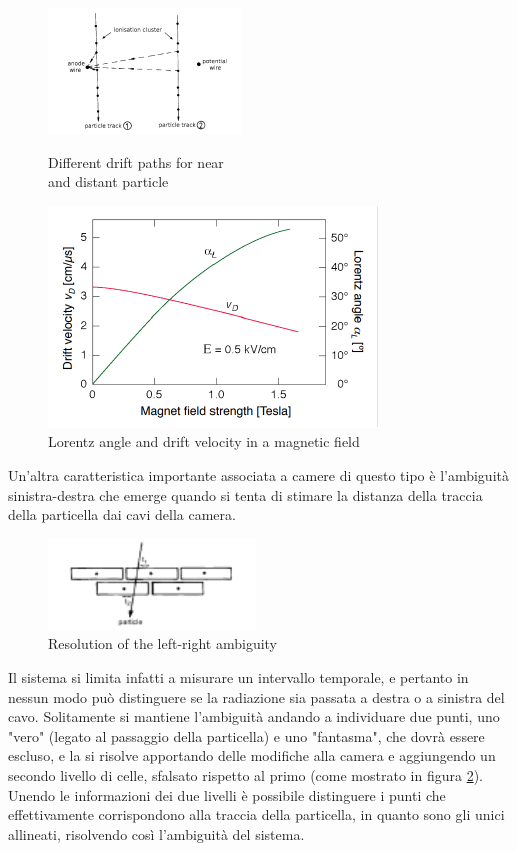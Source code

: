 \documentclass[a4paper,11pt]{book}
\begin{document}
\begin{figure}[hbtp]
\begin{minipage}[c]{0.5\textwidth}
\centering
\includegraphics[scale = 2]{pictures/drift_ch_diff_paths.pdf}
\caption{Different drift paths for near\\ and distant particle}
\label{fig:drift_ch_diff_path}
\end{minipage}  
\begin{minipage}[c]{0.5\textwidth}
\centering
\includegraphics[scale=1]{pictures/lorentz_angle.pdf}
\caption{Lorentz angle and drift velocity in a magnetic field}
\label{fig:lorentz_angle}
\end{minipage}
\end{figure}

Un'altra caratteristica importante associata a camere di questo tipo è l'ambiguità sinistra-destra che emerge quando si tenta di stimare la distanza della traccia della particella dai cavi della camera.
\begin{figure}
\caption{Resolution of the left-right ambiguity}
\label{fig:left_right_ambiguity}
\includegraphics[width=5.5cm]{pictures/drift_ch_left_right.pdf}
\end{figure} 
Il sistema si limita infatti a misurare un intervallo temporale, e pertanto in nessun modo può distinguere se la radiazione sia passata a destra o a sinistra del cavo. Solitamente si mantiene l'ambiguità andando a individuare due punti, uno "vero" (legato al passaggio della particella) e uno "fantasma", che dovrà essere escluso, e la si risolve apportando delle modifiche alla camera e aggiungendo un secondo livello di celle, sfalsato rispetto al primo (come mostrato in figura \ref{fig:left_right_ambiguity}). Unendo le informazioni dei due livelli è possibile distinguere i punti che effettivamente corrispondono alla traccia della particella, in quanto sono gli unici allineati, risolvendo così l'ambiguità del sistema.\\ 
\end{document}
